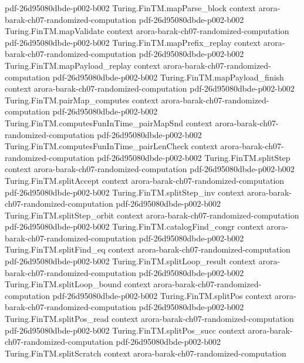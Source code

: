 \begin{theorem}
  {pdf-26d95080dbde-p002-b002}
\proofstep
  {Turing.FinTM.mapParse_block}
  {context}
  {arora-barak-ch07-randomized-computation}
  {pdf-26d95080dbde-p002-b002}
\proofstep
  {Turing.FinTM.mapValidate}
  {context}
  {arora-barak-ch07-randomized-computation}
  {pdf-26d95080dbde-p002-b002}
\proofstep
  {Turing.FinTM.mapPrefix_replay}
  {context}
  {arora-barak-ch07-randomized-computation}
  {pdf-26d95080dbde-p002-b002}
\proofstep
  {Turing.FinTM.mapPayload_replay}
  {context}
  {arora-barak-ch07-randomized-computation}
  {pdf-26d95080dbde-p002-b002}
\proofstep
  {Turing.FinTM.mapPayload_finish}
  {context}
  {arora-barak-ch07-randomized-computation}
  {pdf-26d95080dbde-p002-b002}
\proofstep
  {Turing.FinTM.pairMap_computes}
  {context}
  {arora-barak-ch07-randomized-computation}
  {pdf-26d95080dbde-p002-b002}
\proofstep
  {Turing.FinTM.computesFunInTime_pairMapSnd}
  {context}
  {arora-barak-ch07-randomized-computation}
  {pdf-26d95080dbde-p002-b002}
\proofstep
  {Turing.FinTM.computesFunInTime_pairLenCheck}
  {context}
  {arora-barak-ch07-randomized-computation}
  {pdf-26d95080dbde-p002-b002}
\proofstep
  {Turing.FinTM.splitStep}
  {context}
  {arora-barak-ch07-randomized-computation}
  {pdf-26d95080dbde-p002-b002}
\proofstep
  {Turing.FinTM.splitAccept}
  {context}
  {arora-barak-ch07-randomized-computation}
  {pdf-26d95080dbde-p002-b002}
\proofstep
  {Turing.FinTM.splitStep_inv}
  {context}
  {arora-barak-ch07-randomized-computation}
  {pdf-26d95080dbde-p002-b002}
\proofstep
  {Turing.FinTM.splitStep_orbit}
  {context}
  {arora-barak-ch07-randomized-computation}
  {pdf-26d95080dbde-p002-b002}
\proofstep
  {Turing.FinTM.catalogFind_congr}
  {context}
  {arora-barak-ch07-randomized-computation}
  {pdf-26d95080dbde-p002-b002}
\proofstep
  {Turing.FinTM.splitFind_eq}
  {context}
  {arora-barak-ch07-randomized-computation}
  {pdf-26d95080dbde-p002-b002}
\proofstep
  {Turing.FinTM.splitLoop_result}
  {context}
  {arora-barak-ch07-randomized-computation}
  {pdf-26d95080dbde-p002-b002}
\proofstep
  {Turing.FinTM.splitLoop_bound}
  {context}
  {arora-barak-ch07-randomized-computation}
  {pdf-26d95080dbde-p002-b002}
\proofstep
  {Turing.FinTM.splitPos}
  {context}
  {arora-barak-ch07-randomized-computation}
  {pdf-26d95080dbde-p002-b002}
\proofstep
  {Turing.FinTM.splitPos_read}
  {context}
  {arora-barak-ch07-randomized-computation}
  {pdf-26d95080dbde-p002-b002}
\proofstep
  {Turing.FinTM.splitPos_succ}
  {context}
  {arora-barak-ch07-randomized-computation}
  {pdf-26d95080dbde-p002-b002}
\proofstep
  {Turing.FinTM.splitScratch}
  {context}
  {arora-barak-ch07-randomized-computation}

\end{theorem}
